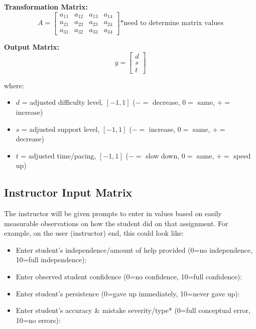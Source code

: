 \documentclass{article}
\begin{document}
        \textbf{Transformation Matrix:}
            \[
                A = \begin{bmatrix} 
                a_{11} & a_{12} & a_{13} & a_{14} \\
                a_{21} & a_{22} & a_{23} & a_{24} \\
                a_{31} & a_{32} & a_{33} & a_{34}
                \end{bmatrix}
                \text{*need to determine matrix values}
            \]

        \textbf{Output Matrix:}
            \[
                y = \begin{bmatrix} d \\ s \\ t \end{bmatrix}
            \]

        where:
            \begin{itemize}
                \item $d$ = adjusted difficulty level, $[-1, 1]$ ($- = $ decrease, $0 = $ same, $+ = $ increase)
                \item $s$ = adjusted support level, $[-1, 1]$ ($- = $ increase, $0 = $ same, $+ = $ decrease)
                \item $t$ = adjusted time/pacing, $[-1, 1]$ ($- = $ slow down, $0 = $ same, $+ = $ speed up)
            \end{itemize}

    \subsection{Instructor Input Matrix}

        The instructor will be given prompts to enter in values based on easily measurable observations on how the student did on that assignment. For example, on the user (instructor) end, this could look like:

        \begin{itemize}
            \item Enter student's independence/amount of help provided (0=no independence, 10=full independence):
            \item Enter observed student confidence (0=no confidence, 10=full confidence):
            \item Enter student's persistence (0=gave up immediately, 10=never gave up):
            \item Enter student's accuracy \& mistake severity/type* (0=full conceptual error, 10=no errors):
        \end{itemize}
\end{document}
